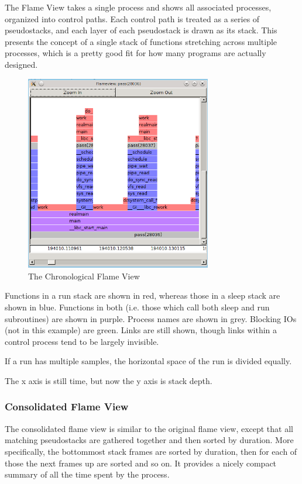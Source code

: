 \documentclass[10pt]{article}
\begin{document}
The Flame View takes a single process and shows all associated processes, organized into control paths.  Each control path is treated as a series of pseudostacks, and each layer of each pseudostack is drawn as its stack.  This presents the concept of a single stack of functions stretching across multiple processes, which is a pretty good fit for how many programs are actually designed.

\begin{figure}[h!]
\includegraphics[width=3.2in]{images/flameshot}
\caption{The Chronological Flame View}
\end{figure}

Functions in a run stack are shown in red, whereas those in a sleep stack are shown in blue.  Functions in both (i.e. those which call both sleep and run subroutines) are shown in purple. Process names are shown in grey.  Blocking IOs (not in this example) are green.  Links are still shown, though links within a control process tend to be largely invisible.

If a run has multiple samples, the horizontal space of the run is divided equally.

The x axis is still time, but now the y axis is stack depth.

\subsubsection{Consolidated Flame View}

The consolidated flame view is similar to the original flame view, except that all matching pseudostacks are gathered together and then sorted by duration.  More specifically, the bottommost stack frames are sorted by duration, then for each of those the next frames up are sorted and so on.  It provides a nicely compact summary of all the time spent by the process.
\end{document}
